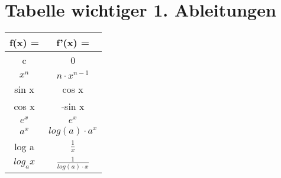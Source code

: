 \documentclass[../mainfile.tex]{subfiles}
\begin{document}
				
	\section{Tabelle wichtiger 1. Ableitungen}
		{\centering
		{\large
		\renewcommand{\arraystretch}{1.3}
		\begin{tabular}{c|c}
			f(x) =		&	f'(x) =                     \\ \hline
			c           &	0                           \\ \hline
			$x^n$ 	    &	$n \cdot x^{n-1}$ 			\\ \hline
			sin x       &	cos x                       \\ \hline
			cos x       &	-sin x                      \\ \hline
			$e^x$		&	$e^x$         				\\ \hline
			$a^x$ 		&	$log(a) \cdot a^x$  		\\ \hline
			log a       &	$\frac{1}{x}$               \\ \hline
			$log_a x$   &	$\frac{1}{log(a) \cdot x}$                 
		\end{tabular}\par
		}		
		}
		\renewcommand{\arraystretch}{1.3}
		
\end{document}
